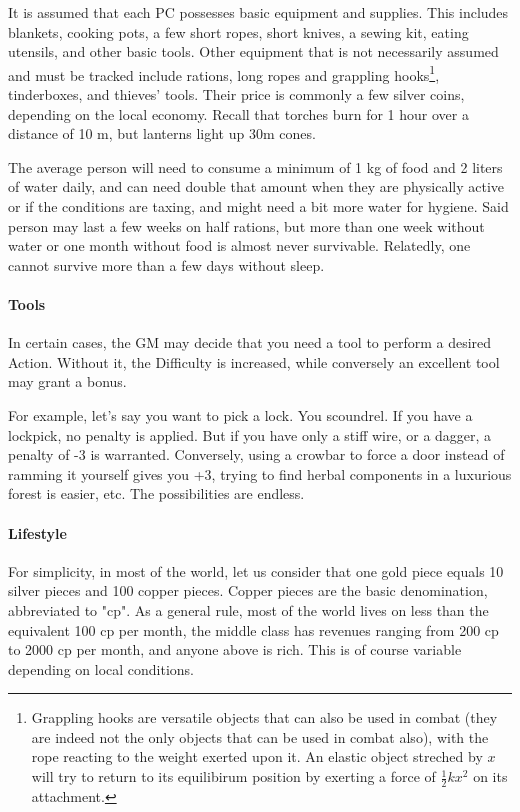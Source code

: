 It is assumed that each PC possesses basic equipment and supplies. This includes blankets, cooking pots, a few short ropes, short knives, a sewing kit, eating utensils, and other basic tools. Other equipment that is not necessarily assumed and must be tracked include rations, long ropes and grappling hooks\footnote{Grappling hooks are versatile objects that can also be used in combat (they are indeed not the only objects that can be used in combat also), with the rope reacting to the weight exerted upon it. An elastic object streched by $x$ will try to return to its equilibirum position by exerting a force of $\frac{1}{2}kx^2$ on its attachment.}, tinderboxes, and thieves' tools. Their price is commonly a few silver coins, depending on the local economy. Recall that torches burn for 1 hour over a distance of 10 m, but lanterns light up 30m cones.

The average person will need to consume a minimum of 1 kg of food and 2 liters of water daily, and can need double that amount when they are physically active or if the conditions are taxing, and might need a bit more water for hygiene. Said person may last a few weeks on half rations, but more than one week without water or one month without food is almost never survivable. Relatedly, one cannot survive more than a few days without sleep.


\paragraph{Tools}

In certain cases, the GM may decide that you need a tool to perform a desired Action. Without it, the Difficulty is increased, while conversely an excellent tool may grant a bonus. 

For example, let's say you want to pick a lock. You scoundrel. If you have a lockpick, no penalty is applied. But if you have only a stiff wire, or a dagger, a penalty of -3 is warranted. Conversely, using a crowbar to force a door instead of ramming it yourself gives you +3, trying to find herbal components in a luxurious forest is easier, etc. The possibilities are endless.


\paragraph{Lifestyle} 

For simplicity, in most of the world, let us consider that one gold piece equals 10 silver pieces and 100 copper pieces. Copper pieces are the basic denomination, abbreviated to "cp". As a general rule, most of the world lives on less than the equivalent 100 cp per month, the middle class has revenues ranging from 200 cp to 2000 cp per month, and anyone above is rich. This is of course variable depending on local conditions.


